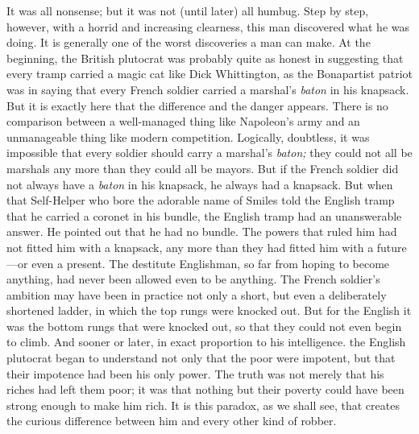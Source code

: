 \documentclass{book}
\begin{document}
It was all nonsense; but it was not (until later) all humbug. Step by step, however, with a horrid and increasing clearness, this man discovered what he was doing. It is generally one of the worst discoveries a man can make. At the beginning, the British plutocrat was probably quite as honest in suggesting that every tramp carried a magic cat like Dick Whittington, as the Bonapartist patriot was in saying that every French soldier carried a marshal’s \emph{baton} in his knapsack. But it is exactly here that the difference and the danger appears. There is no comparison between a well-managed thing like Napoleon’s army and an unmanageable thing like modern competition. Logically, doubtless, it was impossible that every soldier should carry a marshal’s \emph{baton;} they could not all be marshals any more than they could all be mayors. But if the French soldier did not always have a \emph{baton} in his knapsack, he always had a knapsack. But when that Self-Helper who bore the adorable name of Smiles told the English tramp that he carried a coronet in his bundle, the English tramp had an unanswerable answer. He pointed out that he had no bundle. The powers that ruled him had not fitted him with a knapsack, any more than they had fitted him with a future—or even a present. The destitute Englishman, so far from hoping to become anything, had never been allowed even to be anything. The French soldier’s ambition may have been in practice not only a short, but even a deliberately shortened ladder, in which the top rungs were knocked out. But for the English it was the bottom rungs that were knocked out, so that they could not even begin to climb. And sooner or later, in exact proportion to his intelligence. the English plutocrat began to understand not only that the poor were impotent, but that their impotence had been his only power. The truth was not merely that his riches had left them poor; it was that nothing but their poverty could have been strong enough to make him rich. It is this paradox, as we shall see, that creates the curious difference between him and every other kind of robber.
\end{document}
